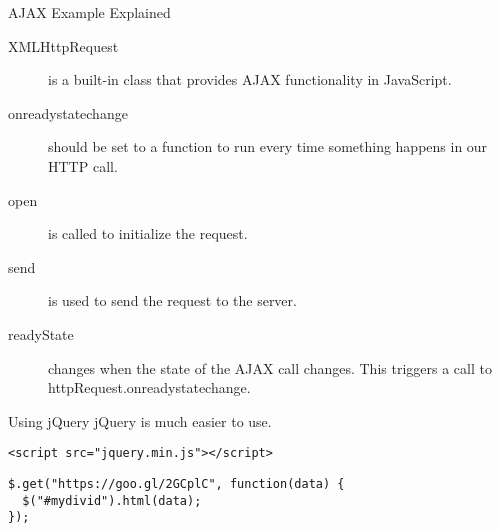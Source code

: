 \begin{frame}{AJAX Example Explained}
  \begin{description}
    \item[XMLHttpRequest] is a built-in class that provides AJAX functionality in JavaScript.
    \item[onreadystatechange] should be set to a function to run every time something happens in our HTTP call.
    \item[open] is called to initialize the request.
    \item[send] is used to send the request to the server.
    \item[readyState] changes when the state of the AJAX call changes. This triggers a call to httpRequest.onreadystatechange.
  \end{description}
\end{frame}


\begin{frame}[fragile]{Using jQuery}
jQuery is much easier to use.
\hr
  \begin{verbatim}
<script src="jquery.min.js"></script>
  \end{verbatim}
  \begin{verbatim}
$.get("https://goo.gl/2GCplC", function(data) {
  $("#mydivid").html(data);
});
  \end{verbatim}
\end{frame}